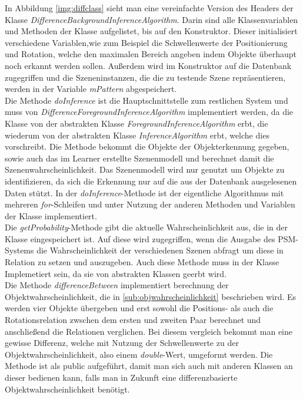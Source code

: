 In Abbildung \ref{img:diffclass} sieht man eine vereinfachte Version des Headers der Klasse \textit{DifferenceBackgroundInferenceAlgorithm}. Darin sind alle Klassenvariablen und Methoden der Klasse aufgelistet, bis auf den Konstruktor. Dieser initialisiert verschiedene Variablen,wie zum Beispiel die Schwellenwerte der Positionierung und Rotation, welche den maximalen Bereich angeben indem Objekte überhaupt noch erkannt werden sollen. Außerdem wird im Konstruktor auf die Datenbank zugegriffen und die Szeneninstanzen, die die zu testende Szene repräsentieren, werden in der Variable \textit{mPattern} abgespeichert.\smallskip\\
Die Methode \textit{doInference} ist die Hauptschnittstelle zum restlichen System und muss von \textit{DifferenceForegroundInferenceAlgorithm} implementiert werden, da die Klasse von der abstrakten Klasse \textit{ForegroundInferenceAlgorithm} erbt, die wiederum von der abstrakten Klasse \textit{InferenceAlgorithm} erbt, welche dies vorschreibt. Die Methode bekommt die Objekte der Objekterkennung gegeben, sowie auch das im Learner erstellte Szenenmodell und berechnet damit die Szenenwahrscheinlichkeit. Das Szenenmodell wird nur genutzt um Objekte zu identifizieren, da sich die Erkennung nur auf die aus der Datenbank ausgelesenen Daten stützt. In der \textit{doInference}-Methode ist der eigentliche Algorithmus mit mehreren \textit{for}-Schleifen und unter Nutzung der anderen Methoden und Variablen der Klasse  implementiert.\smallskip\\
Die \textit{getProbability}-Methode gibt die aktuelle Wahrscheinlichkeit aus, die in der Klasse eingespeichert ist. Auf diese wird zugegriffen, wenn die Ausgabe des PSM-Systems die Wahrscheinlichkeit der verschiedenen Szenen abfragt um diese in Relation zu setzen und auszugeben. Auch diese Methode muss in der Klasse Implemetiert sein, da sie von abstrakten Klassen geerbt wird.\smallskip\\
Die Methode \textit{differenceBetween} implementiert berechnung der Objektwahrscheinlichkeit, die in \ref{sub:objwahrscheinlichkeit} beschrieben wird. Es werden vier Objekte übergeben und erst sowohl die Positions- als auch die Rotationsrelation zwschen dem ersten und zweiten Paar berechnet und anschließend die Relationen verglichen. Bei diesem vergleich bekommt man eine gewisse Differenz, welche mit Nutzung der Schwellenwerte zu der Objektwahrscheinlichkeit, also einem \textit{double}-Wert, umgeformt werden. Die Methode ist als public aufgeführt, damit man sich auch mit anderen Klassen an dieser bedienen kann, falls man in Zukunft eine differenzbasierte Objektwahrscheinlichkeit benötigt. \smallskip\\
